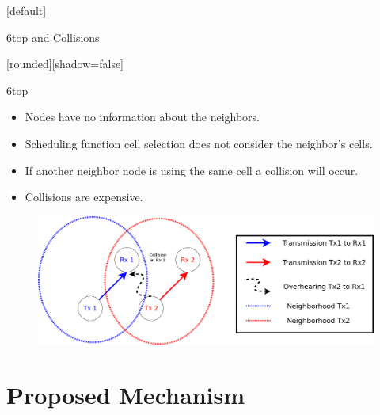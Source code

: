\documentclass{beamer}
\makeatletter
\newenvironment{withoutheadline}{
        \setbeamertemplate{headline}[default]
        \def\beamer@entrycode{\vspace*{-\headheight}}
    }{}
\makeatother
\begin{document}
  \begin{withoutheadline}
\begin{frame}{6top and Collisions}

[rounded][shadow=false]


\begin{block}{6top}

    \begin{itemize}
    \item Nodes have no information about the neighbors.
    \item<2-> Scheduling function cell selection does not consider the neighbor's cells. 
    \item<3-> If another neighbor node is using the same cell a collision will occur. 
    \item<4-> Collisions are expensive.
    \end{itemize}
    \end{block}

\begin{figure}[p]

\item<2-> \includegraphics[width=0.8\linewidth]{collision.png}
\end{figure}


\end{frame}
\end{withoutheadline}

\section{Proposed Mechanism}
\end{document}
